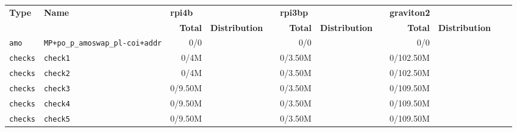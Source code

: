 \begin{tabular}{l l  | r r l | r r l | r r l l}
   \textbf{Type}       & \textbf{Name}                                               & \multicolumn{3}{l}{\textbf{rpi4b}}                         & \multicolumn{3}{l}{\textbf{rpi3bp}}                         & \multicolumn{3}{l}{\textbf{graviton2}}                          & \\
                       &                                                             & \textbf{Total} & \textbf{Distribution} &                   & \textbf{Total} & \textbf{Distribution} &                   & \textbf{Total} & \textbf{Distribution} &                    & \\
            \verb|amo| &                          \verb|MP+po_p_amoswap_pl-coi+addr| &            0/0 &                       &                   &            0/0 &                       &                   &            0/0 &                       &                    & \\ \hline 
         \verb|checks| &                                               \verb|check1| &           0/4M &                       &                   &        0/3.50M &                       &                   &      0/102.50M &                       &                    & \\ \hline 
         \verb|checks| &                                               \verb|check2| &           0/4M &                       &                   &        0/3.50M &                       &                   &      0/102.50M &                       &                    & \\ \hline 
         \verb|checks| &                                               \verb|check3| &        0/9.50M &                       &                   &        0/3.50M &                       &                   &      0/109.50M &                       &                    & \\ \hline 
         \verb|checks| &                                               \verb|check4| &        0/9.50M &                       &                   &        0/3.50M &                       &                   &      0/109.50M &                       &                    & \\ \hline 
         \verb|checks| &                                               \verb|check5| &        0/9.50M &                       &                   &        0/3.50M &                       &                   &      0/109.50M &                       &                    & \\ \hline 

\end{tabular}
